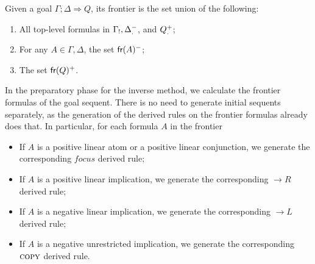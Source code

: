 \begin{definition}[Frontier]
  Given a goal $\Gamma;\Delta \Longrightarrow Q$, its frontier is the set union
  of the following:

  \begin{enumerate}
  \item All top-level formulas in $\Gamma_!,
    \Delta_.^-$, and $Q_.^+$;
  \item For any $A \in \Gamma, \Delta$, the set $\textsf{fr}(A)^-$;
  \item The set $\textsf{fr}(Q)^+$.
  \end{enumerate}
\end{definition}

In the preparatory phase for the inverse method, we calculate the frontier
formulas of the goal sequent. There is no need to generate initial sequents
separately, as the generation of the derived rules on the frontier formulas
already does that. In particular, for each formula $A$ in the frontier

\begin{itemize}
\item If $A$ is a positive linear atom or a positive linear conjunction, we
  generate the corresponding $focus$ derived rule;
\item If $A$ is a positive linear implication, we generate the corresponding
  $\rightarrow R$ derived rule;
\item If $A$ is a negative linear implication, we generate the corresponding
  $\rightarrow L$ derived rule;
\item If $A$ is a negative unrestricted implication, we generate the
  corresponding $\textsc{copy}$ derived rule.
\end{itemize}

